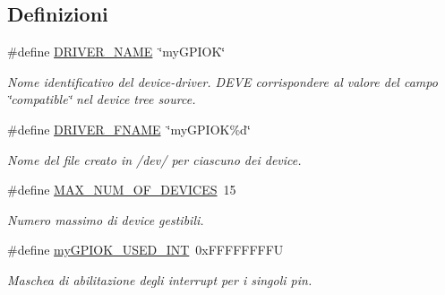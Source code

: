 \subsection*{Definizioni}
\begin{DoxyCompactItemize}
\item 
\#define \hyperlink{group___linux-_driver_ga25634d21648ca7fb7a2aca614bafaaeb}{D\+R\+I\+V\+E\+R\+\_\+\+N\+A\+ME}~\char`\"{}my\+G\+P\+I\+OK\char`\"{}
\begin{DoxyCompactList}\small\item\em Nome identificativo del device-\/driver. D\+E\+VE corrispondere al valore del campo \char`\"{}compatible\char`\"{} nel device tree source. \end{DoxyCompactList}\item 
\#define \hyperlink{group___linux-_driver_ga4fa7cb23649a4090e79e2610b7ba0a93}{D\+R\+I\+V\+E\+R\+\_\+\+F\+N\+A\+ME}~\char`\"{}my\+G\+P\+I\+OK\%d\char`\"{}
\begin{DoxyCompactList}\small\item\em Nome del file creato in /dev/ per ciascuno dei device. \end{DoxyCompactList}\item 
\#define \hyperlink{group___linux-_driver_gad32bf20eb64878cb958ca6ac9c96c21d}{M\+A\+X\+\_\+\+N\+U\+M\+\_\+\+O\+F\+\_\+\+D\+E\+V\+I\+C\+ES}~15
\begin{DoxyCompactList}\small\item\em Numero massimo di device gestibili. \end{DoxyCompactList}\item 
\#define \hyperlink{group___linux-_driver_ga78d3a23bb3381a43eaba8bbf8b1cc750}{my\+G\+P\+I\+O\+K\+\_\+\+U\+S\+E\+D\+\_\+\+I\+NT}~0x\+F\+F\+F\+F\+F\+F\+F\+FU
\begin{DoxyCompactList}\small\item\em Maschea di abilitazione degli interrupt per i singoli pin. \end{DoxyCompactList}\end{DoxyCompactItemize}
